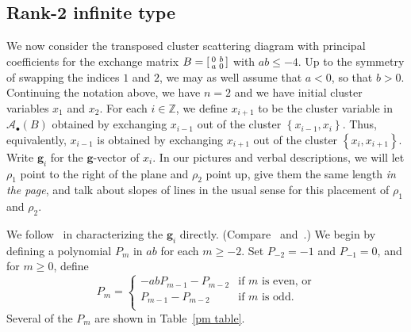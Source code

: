 \documentclass[ALCO,ThmDefs,Unicode,epreuves]{cedram}
\newcommand{\integers}{\mathbb Z}
\newcommand{\set}[1]{{\left\lbrace #1 \right\rbrace}}
\newcommand{\A}{{\mathcal A}}
\newcommand{\g}{\mathbf{g}}
\renewcommand{\a}{\mathbf{a}}
\begin{document}
\subsection{Rank-2 infinite type} \label{rk2 inf sec}
We now consider the transposed cluster scattering diagram with principal coefficients for the exchange matrix $B=\begin{bsmallmatrix}0&b\\a&0\end{bsmallmatrix}$ with $ab\le-4$.
Up to the symmetry of swapping the indices $1$ and $2$, we may as well assume that $a<0$, so that $b>0$.
Continuing the notation above, we have $n=2$ and we have initial cluster variables $x_1$ and $x_2$.
For each $i\in\integers$, we define $x_{i+1}$ to be the cluster variable in $\A_\bullet(B)$ obtained by exchanging $x_{i-1}$ out of the cluster $\set{x_{i-1},x_i}$.
Thus, equivalently, $x_{i-1}$ is obtained by exchanging $x_{i+1}$ out of the cluster $\set{x_i,x_{i+1}}$.
Write $\g_i$ for the $\g$-vector of $x_i$.
In our pictures and verbal descriptions, we will let $\rho_1$ point to the right of the plane and $\rho_2$ point up, give them the same length \emph{in the page}, and talk about slopes of lines in the usual sense for this placement of $\rho_1$ and $\rho_2$.

We follow~\cite[Section~9]{universal} in characterizing the $\g_i$ directly. (Compare~\cite[Example~1.15]{GHKK} and~\cite[Section~3]{CGMMRSW}.)
We begin by defining a polynomial $P_m$ in $ab$ for each $m\ge-2$.
Set $P_{-2}=-1$ and $P_{-1}=0$, and for $m\ge0$, define
\begin{equation}\label{Pm recur}
P_m=\begin{cases}
-abP_{m-1}-P_{m-2}&\text{if }m\text{ is even, or}\\
P_{m-1}-P_{m-2}&\text{if }m\text{ is odd.}\\
\end{cases}
\end{equation}
Several of the $P_m$ are shown in Table~\ref{pm table}.
\end{document}
